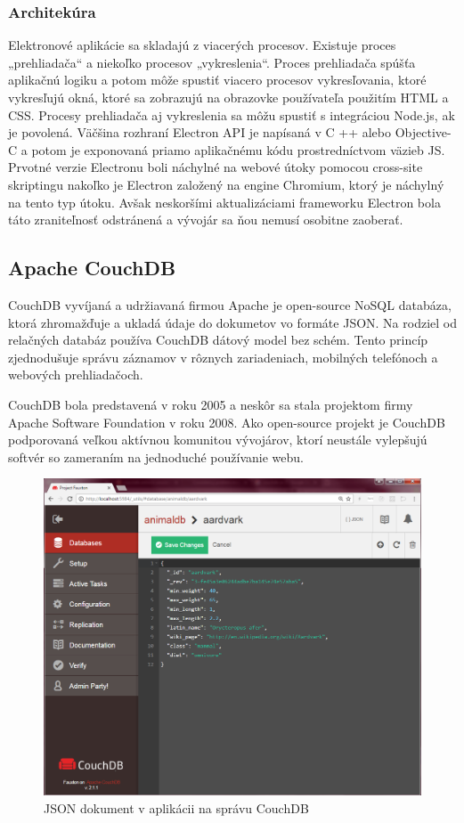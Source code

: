 \subsubsection{Architekúra}
\indent Elektronové aplikácie sa skladajú z viacerých procesov. Existuje proces „prehliadača“ a niekoľko procesov „vykreslenia“. Proces prehliadača spúšťa aplikačnú logiku a potom môže spustiť viacero procesov vykresľovania, ktoré vykresľujú okná, ktoré sa zobrazujú na obrazovke používateľa použitím HTML a CSS. Procesy prehliadača aj vykreslenia sa môžu spustiť s integráciou Node.js, ak je povolená.
\indent Väčšina rozhraní Electron API je napísaná v C ++ alebo Objective-C a potom je exponovaná priamo aplikačnému kódu prostredníctvom väzieb JS. Prvotné verzie Electronu boli náchylné na webové útoky pomocou cross-site skriptingu nakoľko je Electron založený na engine Chromium, ktorý je náchylný na tento typ útoku. Avšak neskoršími aktualizáciami frameworku Electron bola táto zraniteľnosť odstránená a vývojár sa ňou nemusí osobitne zaoberať. 


\subsection{Apache CouchDB}
\indent CouchDB vyvíjaná a udržiavaná firmou Apache je open-source NoSQL databáza, ktorá zhromažďuje a ukladá údaje do dokumetov vo formáte JSON. Na rodziel od relačných databáz používa CouchDB dátový model bez schém. Tento princíp zjednodušuje správu záznamov v rôznych zariadeniach, mobilných telefónoch a webových prehliadačoch.

\indent CouchDB bola predstavená v roku 2005 a neskôr sa stala projektom firmy Apache Software Foundation v roku 2008. Ako open-source projekt je CouchDB podporovaná veľkou aktívnou komunitou vývojárov, ktorí neustále vylepšujú softvér so zameraním na jednoduché používanie webu.

\begin{figure}[H]
    \centering
    \includegraphics[scale=0.25]{img/coucdb.png}
    \caption{JSON dokument v aplikácii na správu CouchDB}
    \label{fig:couch_db}
\end{figure}

